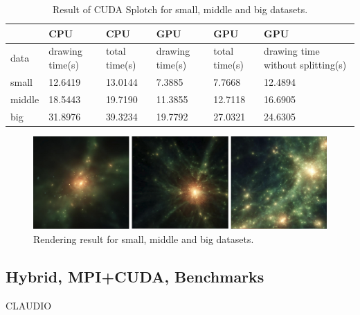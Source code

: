 \begin{table}
\caption{Result of CUDA Splotch for small, middle and big datasets.}
\begin{center}
\begin{tabular}{ | l || l | l || l | l | l |}
\hline  
   &	CPU	& CPU	& GPU	& GPU	& GPU \\
\hline
  data & drawing time(s) & total time(s) & drawing time(s) & total time(s) & drawing time without splitting(s) \\
\hline  
  small &	12.6419	& 13.0144	& 7.3885	& 7.7668	& 12.4894 \\
\hline
  middle &	18.5443 &	19.7190 &	11.3855 &	12.7118 &	16.6905 \\
\hline
  big	& 31.8976 &	39.3234 &	19.7792 &	27.0321	& 24.6305\\
\hline
\end{tabular}
\end{center}
\end{table}

\begin{figure}
\begin{center}
\includegraphics[width=1.0\textwidth]{cu_images.png}
\end{center}
\caption{Rendering result for small, middle and big datasets.}
\end{figure}


\subsection{Hybrid, MPI+CUDA, Benchmarks}
   
CLAUDIO

\label{bench}

